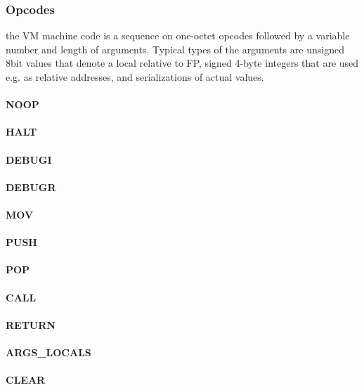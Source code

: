 \documentclass[12pt,a4paper]{article}
\begin{document}

\subsubsection{Opcodes}\label{sec:opcodes}

the VM machine code is a sequence on one-octet opcodes followed by a variable number and length of arguments. Typical types of the arguments are unsigned 8bit values that denote a local relative to FP, signed 4-byte integers that are used e.g. as relative addresses, and serializations of actual values.

\paragraph{NOOP}
\paragraph{HALT}
\paragraph{DEBUGI}
\paragraph{DEBUGR}
\paragraph{MOV}
\paragraph{PUSH}
\paragraph{POP}
\paragraph{CALL}
\paragraph{RETURN}
\paragraph{ARGS\_LOCALS}
\paragraph{CLEAR}
\end{document}
